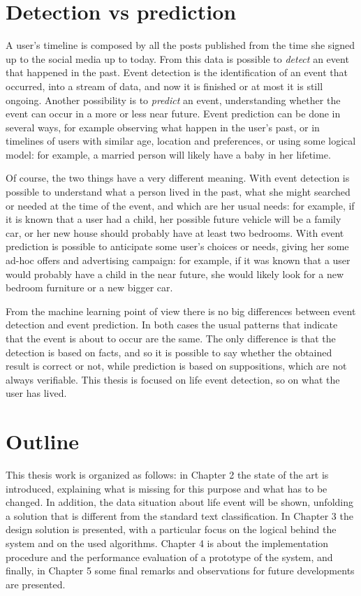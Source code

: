 \section{Detection vs prediction}

A user's timeline is composed by all the posts published from the time she signed up to the social media up to today. From this data is possible to \emph{detect} an event that happened in the past. Event detection is the identification of an event that occurred, into a stream of data, and now it is finished or at most it is still ongoing. Another possibility is to \emph{predict} an event, understanding whether the event can occur in a more or less near future. Event prediction can be done in several ways, for example observing what happen in the user's past, or in timelines of users with similar age, location and preferences, or using some logical model: for example, a married person will likely have a baby in her lifetime.

Of course, the two things have a very different meaning. With event detection is possible to understand what a person lived in the past, what she might searched or needed at the time of the event, and which are her usual needs: for example, if it is known that a user had a child, her possible future vehicle will be a family car, or her new house should probably have at least two bedrooms. With event prediction is possible to anticipate some user's choices or needs, giving her some ad-hoc offers and advertising campaign: for example, if it was known that a user would probably have a child in the near future, she would likely look for a new bedroom furniture or a new bigger car.

From the machine learning point of view there is no big differences between event detection and event prediction. In both cases the usual patterns that indicate that the event is about to occur are the same. The only difference is that the detection is based on facts, and so it is possible to say whether the obtained result is correct or not, while prediction is based on suppositions, which are not always verifiable. This thesis is focused on life event detection, so on what the user has lived.

\section{Outline}

This thesis work is organized as follows: in Chapter 2 the state of the art is introduced, explaining what is missing for this purpose and what has to be changed. In addition, the data situation about life event will be shown, unfolding a solution that is different from the standard text classification. In Chapter 3 the design solution is presented, with a particular focus on the logical behind the system and on the used algorithms. Chapter 4 is about the implementation procedure and the performance evaluation of a prototype of the system, and finally, in Chapter 5 some final remarks and observations for future developments are presented.

